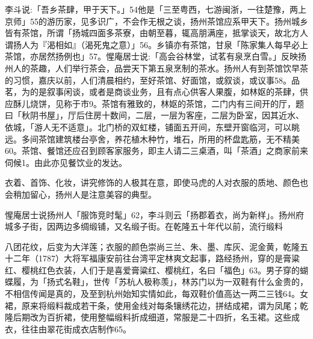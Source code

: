 李斗说:「吾乡茶肆，甲于天下。」54他是「三至粤西，七游闽浙，一往楚豫，两上京师」55的游历家，见多识广，不会作无根之谈，扬州茶馆应系甲天下。扬州城乡皆有茶馆，所谓「扬城四面多茶寮，由朝至暮，辄高朋满座，抵掌谈天，故北方人谓扬人为『渴相如』（渴死鬼之意）」56。乡镇亦有茶馆，甘泉「陈家集人每早必上茶馆，亦居然扬例也」57。惺庵居士说:「高会谷林堂，试茗有泉烹白雪。」反映扬州人的茶趣，人们举行茶会，品尝天下第五泉烹制的茶水。扬州人有到茶馆饮早茶的习惯，嘉庆以前，人们清晨相约，至好茶馆、好面馆，或叙谈，或议事58。品茗，为的是叙事闲谈，或者是商谈业务，且有点心供客人果腹，如林妪的茶肆，供应酥儿烧饼，见称于市9。茶馆有雅致的，林妪的茶馆，二门内有三间开的厅，题曰「秋阴书屋」，厅后住房十数间，二层，一层为客座，二层为卧室，因其近水、依城，「游人无不适意」。北门桥的双虹楼，铺面五开间，东壁开窗临河，可以眺远。多间茶馆建筑楼台亭舍，养花植木种竹，堆石，所用的杯盘匙筋，无不精美60。茶馆、餐馆还应召到顾客家服务，即主人请二三桌酒，叫「茶酒」之商家前来伺候1。由此亦见餐饮业的发达。


衣着、首饰、化妆，讲究修饰的人极其在意，即使马虎的人对衣服的质地、颜色也会稍加留心，扬州人是注意美容的典型。

惺庵居士说扬州人「服饰竞时髦」62，李斗则云「扬郡着衣，尚为新样」。扬州府城多子街，因两边多绸缎铺，又名缎子街。在乾隆五十年代以前，流行缎料

\vfill
\begin{BookNotes}
\end{BookNotes}

\noindent 八团花纹，后变为大洋莲；衣服的颜色崇尚三兰、朱、墨、库灰、泥金黄，乾隆五十二年（1787）大将军福康安前往台湾平定林爽文起事，路经扬州，穿的是膏粱红、樱桃红色衣装，人们于是喜爱膏粱红、樱桃红，名曰「福色」63。男子穿的蝴蝶履，为「扬式名鞋」，世传「苏杭人极称羡」，林苏门以为一双鞋有什么金贵的，不相信传闻是真的，及至到杭州始知实情如此，每双鞋价值高达一两二三钱64。女裙，原来将缎料裁成若干条，使用金线对每条镶绣花边，拼结成裙，谓为凤尾；乾隆后期改为百折裙，使用整幅缎料折成细道，常服是二十四折，名玉裙。这些成衣，往往由翠花街成衣店制作65。

